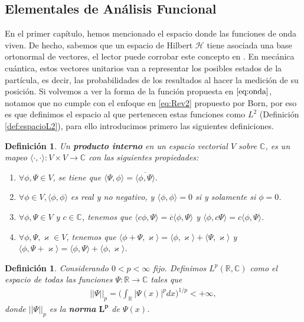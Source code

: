 \documentclass[12pt]{article}
\newtheorem{defn}[teo]{Definición}
\theoremstyle{definition}
\newcommand*{\field}[1]{\mathbb{#1}}
\begin{document}
\subsection{Elementales de Análisis Funcional} \label{sec:EAF}
\noindent
En el primer capítulo, hemos mencionado el espacio donde las funciones de onda viven. De hecho, sabemos que un espacio de Hilbert $\mathcal{H}$ tiene asociada una base ortonormal de vectores, el lector puede corrobar este concepto en \cite{Reed}. En mecánica cuántica, estos vectores unitarios van a representar los posibles estados de la partícula, es decir, las probabilidades de los resultados al hacer la medición de su posición. Si volvemos a ver la forma de la función propuesta en  $\eqref{eq:onda}$, notamos que no cumple con el enfoque en \eqref{eq:Rev2} propuesto por Born, por eso es que definimos el espacio al que pertenecen estas funciones como $L^2$ (Definición \ref{def:espacioL2}), para ello introducimos primero las siguientes definiciones. 
\begin{defn}
    Un \textbf{producto interno} en un espacio vectorial $V$ sobre $\field{C}$, es un mapeo $\langle\cdot,\cdot \rangle:V\times V \rightarrow \field{C}$ con las siguientes propiedades:
    \begin{enumerate}[1.]
    \item  $\forall \phi,\Psi \in V$, se tiene que $\langle\Psi,\phi\rangle = \overline{\langle\phi,\Psi\rangle}.$
    \item $\forall \phi \in V, \langle\phi,\phi\rangle$ es real y no negativo, y $\langle\phi,\phi\rangle = 0$ si y solamente si $\phi = 0$.
    \item $\forall \phi,\Psi \in V$ y $c\in\field{C}$, tenemos que $\langle c\phi,\Psi \rangle = \overline{c}\langle \phi,\Psi\rangle$ y $\langle\phi,c\Psi\rangle = c\langle\phi,\Psi\rangle$.
    \item $\forall \phi,\Psi,\varkappa \in V$, tenemos que $\langle\phi+\Psi,\varkappa\rangle = \langle\phi,\varkappa\rangle + \langle\Psi,\varkappa\rangle$ y $\langle\phi,\Psi+\varkappa\rangle = \langle\phi,\Psi\rangle + \langle\phi,\varkappa\rangle$.
    \end{enumerate}
    \label{def:ProdInt}
\end{defn}
\begin{defn}
    Considerando $0<p<\infty$ fijo. Definimos $L^{p}(\field{R},\field{C})$ como el espacio de todas las funciones $\Psi:\field{R}\rightarrow\field{C}$ tales que
    \begin{align*}
        ||\Psi||_{p} =\bigg( \int_{\field{R}}|\Psi(x)|^{p}dx\bigg)^{1/p} < +\infty,
    \end{align*}
    donde $||\Psi||_{p}$ es la \textbf{norma} $\boldsymbol{L^{p}}$ de $\Psi(x)$.
\end{defn}
\end{document}
